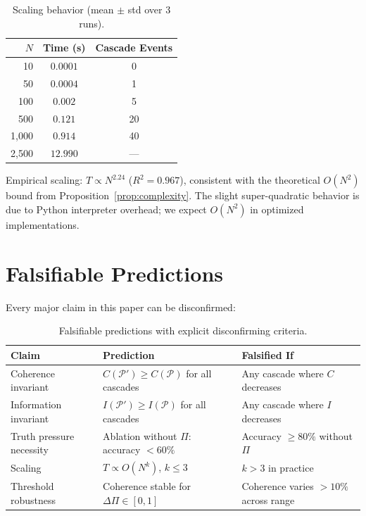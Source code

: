 \documentclass[11pt,a4paper]{article}
\theoremstyle{definition}
\newcommand{\tp}{\Pi}
\begin{document}
\begin{table}[H]
\centering
\caption{Scaling behavior (mean $\pm$ std over 3 runs).}
\label{tab:scaling}
\begin{tabular}{@{}rcc@{}}
\toprule
$N$ & \textbf{Time (s)} & \textbf{Cascade Events} \\
\midrule
10 & $0.0001$ & 0 \\
50 & $0.0004$ & 1 \\
100 & $0.002$ & 5 \\
500 & $0.121$ & 20 \\
1{,}000 & $0.914$ & 40 \\
2{,}500 & $12.990$ & --- \\
\bottomrule
\end{tabular}
\end{table}

Empirical scaling: $T \propto N^{2.24}$ ($R^2 = 0.967$), consistent with the theoretical $O(N^2)$ bound from Proposition~\ref{prop:complexity}. The slight super-quadratic behavior is due to Python interpreter overhead; we expect $O(N^2)$ in optimized implementations.

\section{Falsifiable Predictions}\label{sec:falsifiable}

Every major claim in this paper can be disconfirmed:

\begin{table}[H]
\centering
\caption{Falsifiable predictions with explicit disconfirming criteria.}
\label{tab:falsifiable}
\begin{tabular}{@{}p{4cm}p{4cm}p{4.5cm}@{}}
\toprule
\textbf{Claim} & \textbf{Prediction} & \textbf{Falsified If} \\
\midrule
Coherence invariant & $C(\mathcal{P}') \geq C(\mathcal{P})$ for all cascades & Any cascade where $C$ decreases \\
Information invariant & $I(\mathcal{P}') \geq I(\mathcal{P})$ for all cascades & Any cascade where $I$ decreases \\
Truth pressure necessity & Ablation without $\tp$: accuracy $< 60\%$ & Accuracy $\geq 80\%$ without $\tp$ \\
Scaling & $T \propto O(N^k)$, $k \leq 3$ & $k > 3$ in practice \\
Threshold robustness & Coherence stable for $\Delta\tp \in [0, 1]$ & Coherence varies $> 10\%$ across range \\
\bottomrule
\end{tabular}
\end{table}
\end{document}
